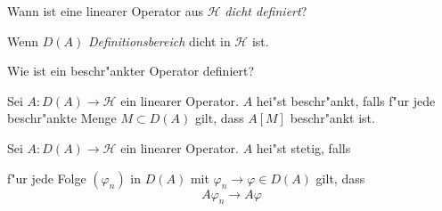 \documentclass[9pt]{article}
\newcommand{\Hi}{\mathcal{H}}
\newenvironment{field}{}{\newpage}
\newif\ifnote
\newenvironment{note}{\notetrue}{\notefalse}
\newcommand{\localtag}{}
\newcommand{\globaltag}{}
\newcommand{\uuid}{}
\newcommand{\tags}[1]{
    \ifnote 
        \renewcommand{\localtag}{#1}
    \else
        \renewcommand{\globaltag}{#1}
    \fi 
    }
\newcommand{\xplain}[1]{\renewcommand{\uuid}{#1}}
\begin{document}

\tags{mathe2::2sem::hilbertraum, beschrankte-lineare-operatoren}

\begin{note}
	\xplain{a095d0e5-ba05-4a86-8601-7c56267afc34}
	\tags{}
	
	\begin{field}  %
		Wann ist eine linearer Operator aus $\Hi$ \textit{dicht definiert}?
	\end{field}
	
	\begin{field}  %
		Wenn $D(A)$ \textit{Definitionsbereich} dicht in $\Hi$ ist.
	\end{field}
\end{note}
	\begin{note}
		\xplain{8220fc0f-51a5-419d-8b5b-a7a6c8241a58}
		\tags{6.1.3}
		
		\begin{field}  %
			Wie ist ein beschr"ankter Operator definiert?	
		\end{field}
		
		\begin{field}  %
			Sei $A: D(A) \rightarrow \Hi$ ein linearer Operator. $A$ hei"st beschr"ankt, falls
			f"ur jede beschr"ankte Menge $M\subset D(A)$ gilt, dass $A[M]$ beschr"ankt ist.
		\end{field}
		
			
		\begin{field}  %
			Sei $A: D(A) \rightarrow \Hi$ ein linearer Operator. $A$ hei"st stetig, falls
		\end{field}
		
		\begin{field}  %
			f"ur jede Folge $(\varphi_n)$ in $D(A)$ mit $\varphi_n \rightarrow \varphi \in D(A)$ gilt, dass
			\begin{equation*}
				A\varphi_n \rightarrow A\varphi
			\end{equation*}
		\end{field}
	\end{note}
\end{document}

